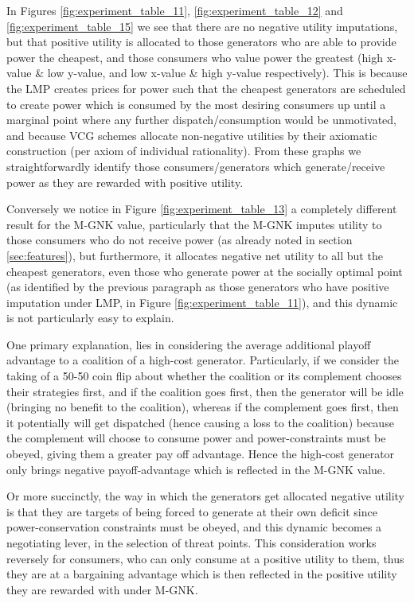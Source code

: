 In Figures \ref{fig:experiment_table_11}, \ref{fig:experiment_table_12} and \ref{fig:experiment_table_15} we see that there are no negative utility imputations, but that positive utility is allocated to those generators who are able to provide power the cheapest, and those consumers who value power the greatest (high x-value \& low y-value, and low x-value \& high y-value respectively).
This is because the LMP creates prices for power such that the cheapest generators are scheduled to create power which is consumed by the most desiring consumers up until a marginal point where any further dispatch/consumption would be unmotivated, and because VCG schemes allocate non-negative utilities by their axiomatic construction (per axiom of individual rationality).
From these graphs we straightforwardly identify those consumers/generators which generate/receive power as they are rewarded with positive utility.

Conversely we notice in Figure \ref{fig:experiment_table_13} a completely different result for the M-GNK value, particularly that the M-GNK imputes utility to those consumers who do not receive power (as already noted in section \ref{sec:features}), but furthermore, it allocates negative net utility to all but the cheapest generators, even those who generate power at the socially optimal point (as identified by the previous paragraph as those generators who have positive imputation under LMP, in Figure \ref{fig:experiment_table_11}), and this dynamic is not particularly easy to explain.

One primary explanation, lies in considering the average additional playoff advantage to a coalition of a high-cost generator.
Particularly, if we consider the taking of a 50-50 coin flip about whether the coalition or its complement chooses their strategies first, and if the coalition goes first, then the generator will be idle (bringing no benefit to the coalition), whereas if the complement goes first, then it potentially will get dispatched (hence causing a loss to the coalition) because the complement will choose to consume power and power-constraints must be obeyed, giving them a greater pay off advantage.
Hence the high-cost generator only brings negative payoff-advantage which is reflected in the M-GNK value.

Or more succinctly, the way in which the generators get allocated negative utility is that they are targets of being forced to generate at their own deficit since power-conservation constraints must be obeyed, and this dynamic becomes a negotiating lever, in the selection of threat points.
This consideration works reversely for consumers, who can only consume at a positive utility to them, thus they are at a bargaining advantage which is then reflected in the positive utility they are rewarded with under M-GNK.

